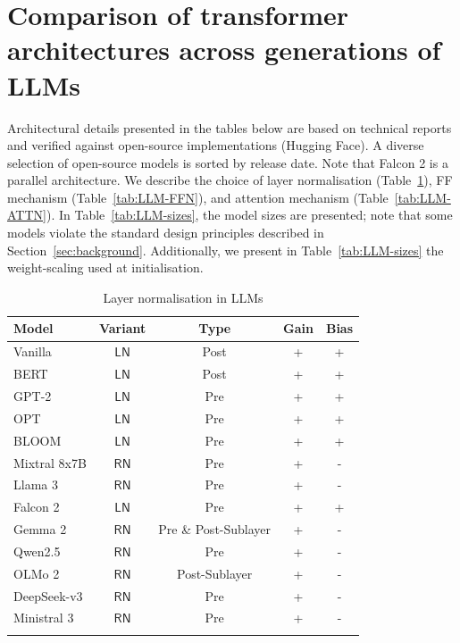 \documentclass[namedate,webpdf,imanum]{ima-authoring-template}
\newcommand{\Layer}[1]{\mathsf{#1}}
\numberwithin{equation}{section}
\begin{document}



\appendix
\renewcommand{\theHsection}{A\arabic{section}}

\section{Comparison of transformer architectures across generations of LLMs}
\label{appendix:llm_comparison}

Architectural details presented in the tables below are based on technical reports and verified against open-source implementations (Hugging Face).
A diverse selection of open-source models is sorted by release date.
Note that Falcon 2 \citep{malartic2024falcon2} is a parallel architecture.
We describe the choice of layer normalisation (Table~\ref{tab:LLM-LN}), FF mechanism (Table~\ref{tab:LLM-FFN}), and attention mechanism (Table~\ref{tab:LLM-ATTN}).
In Table~\ref{tab:LLM-sizes}, the model sizes are presented; note that some models violate the standard design principles described in Section~\ref{sec:background}.
Additionally, we present in Table~\ref{tab:LLM-sizes} the weight-scaling used at initialisation.

\begin{table}[th]
\caption{Layer normalisation in LLMs}
\label{tab:LLM-LN}
\begin{tabular}{@{}lcccc@{}}
\toprule
Model & Variant & Type & Gain & Bias \\
\midrule
Vanilla \citep{vaswani2017attention}  & $\Layer{LN}$ & Post & + & + \\
BERT \citep{devlin2019bert}           & $\Layer{LN}$ & Post & + & + \\
GPT-2 \citep{radford2019language}     & $\Layer{LN}$ & Pre  & + & + \\
OPT \citep{zhang2022opt}              & $\Layer{LN}$ & Pre  & + & + \\
BLOOM \citep{scao2022bloom}           & $\Layer{LN}$ & Pre  & + & + \\
Mixtral 8x7B \citep{jiang2024mixtral} & $\Layer{RN}$ & Pre  & + & - \\
Llama 3 \citep{grattafiori2024llama}  & $\Layer{RN}$ & Pre  & + & - \\
Falcon 2 \citep{malartic2024falcon2}  & $\Layer{LN}$ & Pre  & + & + \\
Gemma 2 \citep{riviere2024gemma}      & $\Layer{RN}$ & Pre \& Post-Sublayer & + & - \\
Qwen2.5 \citep{yang2024qwen25}        & $\Layer{RN}$ & Pre  & + & - \\
OLMo 2 \citep{walsh20252}             & $\Layer{RN}$ & Post-Sublayer & + & - \\
DeepSeek-v3 \citep{liu2024deepseek}   & $\Layer{RN}$ & Pre  & + & - \\
Ministral 3 \citep{liu2026mistral}    & $\Layer{RN}$ & Pre  & + & - \\
\botrule
\end{tabular}
\end{table}
\end{document}
